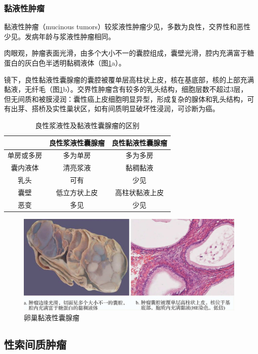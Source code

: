 \subsubsection{黏液性肿瘤}

黏液性肿瘤（mucinous
tumors）较浆液性肿瘤少见，多数为良性，交界性和恶性少见。发病年龄与浆液性肿瘤相同。

肉眼观，肿瘤表面光滑，由多个大小不一的囊腔组成，囊壁光滑，腔内充满富于糖蛋白的灰白色半透明黏稠液体（图\ref{fig11-11}a）。

镜下，良性黏液性囊腺瘤的囊腔被覆单层高柱状上皮，核在基底部，核的上部充满黏液，无纤毛（图\ref{fig11-11}b）。交界性肿瘤含有较多的乳头结构，细胞层数不超过3层，但无间质和被膜浸润：囊性癌上皮细胞明显异型，形成复杂的腺体和乳头结构，可有出芽、搭桥及实性巢状区，如有间质明显破坏性浸润，可诊断为癌。

\begin{table}[ht]
    \caption{良性浆液性及黏液性囊腺瘤的区别}
    \label{tab11-2}
    \centering
    \begin{tabular}{ccc}
    \toprule
    &良性浆液性囊腺瘤&良性黏液性囊腺瘤\\
    \midrule
    单房或多房&多为单房&多为多房\\
囊内液体&清亮浆液&黏稠黏液\\
乳头&可有&少见\\
囊壁&低立方状上皮&高柱状黏液上皮\\
恶变&多见&少见\\
    \bottomrule
    \end{tabular}
\end{table}

\begin{figure}[!htbp]
 \centering
 \includegraphics{./images/Image00198.jpg}
 \captionsetup{justification=centering}
 \caption{卵巢黏液性囊腺瘤}
 \label{fig11-11}
  \end{figure} 

\subsection{性索间质肿瘤}

